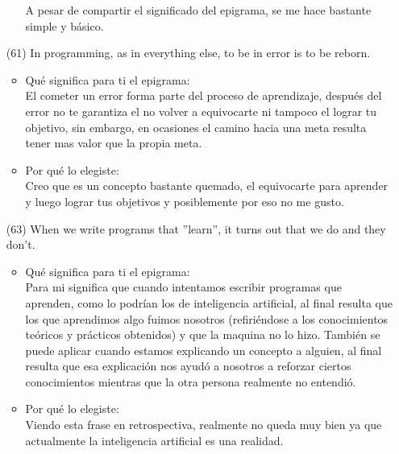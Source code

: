 \documentclass{article}
\begin{document}
\begin{itemize}
\begin{itemize}
        A pesar de compartir el significado del epigrama, se me hace bastante simple y básico.
    \end{itemize}
    \item[(61)]In programming, as in everything else, to be in error is to be reborn.
    \begin{itemize}
        \item Qué significa para ti el epigrama:\\
        El cometer un error forma parte del proceso de aprendizaje, después del error no te garantiza el no volver a equivocarte ni tampoco el lograr tu objetivo, sin embargo, en ocasiones el camino hacia una meta resulta tener mas valor que la propia meta.
        \item Por qué lo elegiste:\\
        Creo que es un concepto bastante quemado, el equivocarte para aprender y luego lograr tus objetivos y posiblemente por eso no me gusto.
    \end{itemize}
    \item[(63)]When we write programs that ”learn”, it turns out that we do and they don’t.
    \begin{itemize}
        \item Qué significa para ti el epigrama:\\
        Para mi significa que cuando intentamos escribir programas que aprenden, como lo podrían los de inteligencia artificial, al final resulta que los que aprendimos algo fuimos nosotros (refiriéndose a los conocimientos teóricos y prácticos obtenidos) y que la maquina no lo hizo. También se puede aplicar cuando estamos explicando un concepto a alguien, al final resulta que esa explicación nos ayudó a nosotros a reforzar ciertos conocimientos mientras que la otra persona realmente no entendió.
        \item Por qué lo elegiste:\\
        Viendo esta frase en retrospectiva, realmente no queda muy bien ya que actualmente la inteligencia artificial es una realidad.
    \end{itemize}

\end{itemize}
\end{document}
